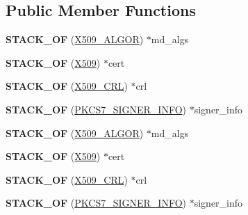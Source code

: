 \subsection*{Public Member Functions}
\begin{DoxyCompactItemize}
\item 
\mbox{\label{structpkcs7__signed__st_a050bcf61058179b5d869b55e7e357816}} 
{\bfseries S\+T\+A\+C\+K\+\_\+\+OF} (\hyperlink{structX509__algor__st}{X509\+\_\+\+A\+L\+G\+OR}) $\ast$md\+\_\+algs
\item 
\mbox{\label{structpkcs7__signed__st_a65d24e39f334b42fa460d9d7a87398ef}} 
{\bfseries S\+T\+A\+C\+K\+\_\+\+OF} (\hyperlink{structx509__st}{X509}) $\ast$cert
\item 
\mbox{\label{structpkcs7__signed__st_ac57f323e546efcca576407ecebd2177a}} 
{\bfseries S\+T\+A\+C\+K\+\_\+\+OF} (\hyperlink{structX509__crl__st}{X509\+\_\+\+C\+RL}) $\ast$crl
\item 
\mbox{\label{structpkcs7__signed__st_a4580e59fda0e62101ecc513a43512cee}} 
{\bfseries S\+T\+A\+C\+K\+\_\+\+OF} (\hyperlink{structpkcs7__signer__info__st}{P\+K\+C\+S7\+\_\+\+S\+I\+G\+N\+E\+R\+\_\+\+I\+N\+FO}) $\ast$signer\+\_\+info
\item 
\mbox{\label{structpkcs7__signed__st_a050bcf61058179b5d869b55e7e357816}} 
{\bfseries S\+T\+A\+C\+K\+\_\+\+OF} (\hyperlink{structX509__algor__st}{X509\+\_\+\+A\+L\+G\+OR}) $\ast$md\+\_\+algs
\item 
\mbox{\label{structpkcs7__signed__st_a65d24e39f334b42fa460d9d7a87398ef}} 
{\bfseries S\+T\+A\+C\+K\+\_\+\+OF} (\hyperlink{structx509__st}{X509}) $\ast$cert
\item 
\mbox{\label{structpkcs7__signed__st_ac57f323e546efcca576407ecebd2177a}} 
{\bfseries S\+T\+A\+C\+K\+\_\+\+OF} (\hyperlink{structX509__crl__st}{X509\+\_\+\+C\+RL}) $\ast$crl
\item 
\mbox{\label{structpkcs7__signed__st_a4580e59fda0e62101ecc513a43512cee}} 
{\bfseries S\+T\+A\+C\+K\+\_\+\+OF} (\hyperlink{structpkcs7__signer__info__st}{P\+K\+C\+S7\+\_\+\+S\+I\+G\+N\+E\+R\+\_\+\+I\+N\+FO}) $\ast$signer\+\_\+info

\end{DoxyCompactItemize}

